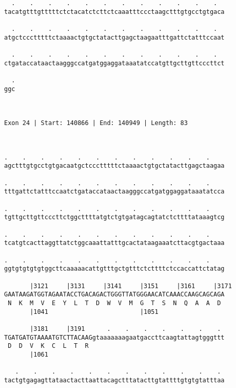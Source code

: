 \documentclass{article}
\begin{document}
\begin{Verbatim}
  .    .    .    .    .    .    .    .    .    .    .    .  
tacatgtttgtttttctctacatctcttctcaaatttccctaagctttgtgcctgtgaca
                                                            
  .    .    .    .    .    .    .    .    .    .    .    .  
atgctccctttttctaaaactgtgctatacttgagctaagaatttgattctatttccaat
                                                            
  .    .    .    .    .    .    .    .    .    .    .    .  
ctgataccataactaagggccatgatggaggataaatatccatgttgcttgttcccttct
                                                            
  .
ggc
   
   
 
Exon 24 | Start: 140866 | End: 140949 | Length: 83



.    .    .    .    .    .    .    .    .    .    .    .    
agctttgtgcctgtgacaatgctccctttttctaaaactgtgctatacttgagctaagaa
                                                            
.    .    .    .    .    .    .    .    .    .    .    .    
tttgattctatttccaatctgataccataactaagggccatgatggaggataaatatcca
                                                            
.    .    .    .    .    .    .    .    .    .    .    .    
tgttgcttgttcccttctggcttttatgtctgtgatagcagtatctcttttataaagtcg
                                                            
.    .    .    .    .    .    .    .    .    .    .    .    
tcatgtcacttaggttatctggcaaattatttgcactataagaaatcttacgtgactaaa
                                                            
.    .    .    .    .    .    .    .    .    .    .    .    
ggtgtgtgtgtggcttcaaaaacattgtttgctgtttctcttttctccaccattctatag
                                                            
       |3121     |3131     |3141     |3151     |3161     |3171
GAATAAGATGGTAGAATACCTGACAGACTGGGTTATGGGAACATCAAACCAAGCAGCAGA
 N  K  M  V  E  Y  L  T  D  W  V  M  G  T  S  N  Q  A  A  D 
       |1041                         |1051                  
  
       |3181     |3191      .    .    .    .    .    .    . 
TGATGATGTAAAATGTCTTACAAGgtaaaaaaagaatgaccttcaagtattagtgggttt
 D  D  V  K  C  L  T  R                                     
       |1061                                                
  
   .    .    .    .    .    .    .    .    .    .    .    . 
tactgtgagagttataactacttaattacagctttatacttgtattttgtgtgtatttaa
                                                            

\end{Verbatim}
\end{document}
